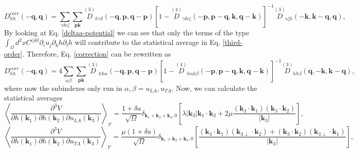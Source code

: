 \begin{equation}
 D_{hh}^{corr}(-\boldsymbol{q},\boldsymbol{q})=\sum_{\gamma\delta\epsilon\zeta}\sum_{\boldsymbol{p}\boldsymbol{k}}\overset{(3)}{D}{}_{h\gamma\delta}(-\boldsymbol{q},\boldsymbol{p},
 \boldsymbol{q}-\boldsymbol{p})[1-\overset{(4)}{D}{}_{\gamma\delta\epsilon\zeta}(-\boldsymbol{p},\boldsymbol{p}-\boldsymbol{q},\boldsymbol{k},\boldsymbol{q}-\boldsymbol{k})]^{-1}\overset{(3)}{D}{}_{
 \epsilon\zeta h}(-\boldsymbol{k},\boldsymbol{k}-\boldsymbol{q},\boldsymbol{q}),
\end{equation}
By looking at Eq. \ref{deltaa-potential} we can see that only the terms of the type $\int_{\Omega}{d^{2}xC^{ijkl}\partial_{i}u_{j}\partial_{k}h\partial_{l}h}$ will contribute to the statistical average in
Eq. \ref{third-order}. Therefore, Eq. \ref{correction} can be rewritten as
\begin{equation}
\label{correction-simple}
 D_{hh}^{corr}(-\boldsymbol{q},\boldsymbol{q})=4\sum_{\alpha\beta}\sum_{\boldsymbol{p}\boldsymbol{k}}\overset{(3)}{D}{}_{hh\alpha}(-\boldsymbol{q},\boldsymbol{p},\boldsymbol{q}-\boldsymbol{p})[
 1-\overset{(4)}{D}{}_{h\alpha h\beta}(-\boldsymbol{p},\boldsymbol{p}-\boldsymbol{q},\boldsymbol{k},\boldsymbol{q}-\boldsymbol{k})]^{-1}\overset{(3)}{D}{}_{hh\beta}(\boldsymbol{q},-\boldsymbol{k},\boldsymbol{k}-\boldsymbol{q}),
\end{equation}
where now the subindexes only run in $\alpha,\beta=u_{LA},u_{TA}$. Now, we can calculate the statistical averages
\begin{equation}
 \left\langle\frac{\partial^{3}V}{\partial h(\boldsymbol{k}_{1})\partial h(\boldsymbol{k}_{2})\partial u_{LA}(\boldsymbol{k}_{3})}\right\rangle_{\mathcal{V}}=\frac{1+\delta a}{\sqrt{\Omega}}\delta_{\boldsymbol{k}_{1}+\boldsymbol{
 k}_{2}+\boldsymbol{k}_{3},0}\left[\lambda|\boldsymbol{k}_{3}|\boldsymbol{k}_{1}\cdot\boldsymbol{k}_{2}+2\mu\frac{(\boldsymbol{k}_{3}\cdot\boldsymbol{k}_{1})(\boldsymbol{k}_{3}\cdot\boldsymbol{k}_{2})}{|\boldsymbol{k}_{3}|}\right],
\end{equation}
\begin{equation}
 \left\langle\frac{\partial^{3}V}{\partial h(\boldsymbol{k}_{1})\partial h(\boldsymbol{k}_{2})\partial u_{TA}(\boldsymbol{k}_{3})}\right\rangle_{\mathcal{V}}=\frac{\mu(1+\delta a)}{\sqrt{\Omega}}\delta_{\boldsymbol{k}_{
 1}+\boldsymbol{k}_{2}+\boldsymbol{k}_{3},0}\left[\frac{(\boldsymbol{k}_{3}\cdot\boldsymbol{k}_{1})(\boldsymbol{k}_{3\perp}\cdot\boldsymbol{k}_{2})+(\boldsymbol{k}_{3}\cdot\boldsymbol{k}_{2})(\boldsymbol{k}_{3\perp}\cdot
 \boldsymbol{k}_{1})}{|\boldsymbol{k}_{3}|}\right],
\end{equation}
